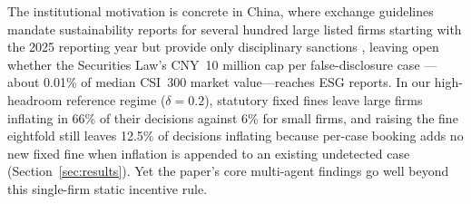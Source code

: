 \documentclass[11pt]{article}
\begin{document}
The institutional motivation is concrete in China, where exchange guidelines mandate sustainability reports for several hundred large listed firms starting with the 2025 reporting year but provide only disciplinary sanctions \citep[e.g.][]{sse2024guideline}, leaving open whether the Securities Law's CNY~10 million cap per false-disclosure case \citep[Art.~197]{securitieslaw2019}---about 0.01\% of median CSI~300 market value---reaches ESG reports. In our high-headroom reference regime ($\delta = 0.2$), statutory fixed fines leave large firms inflating in 66\% of their decisions against 6\% for small firms, and raising the fine eightfold still leaves 12.5\% of decisions inflating because per-case booking adds no new fixed fine when inflation is appended to an existing undetected case (Section~\ref{sec:results}). Yet the paper's core multi-agent findings go well beyond this single-firm static incentive rule.
\end{document}
